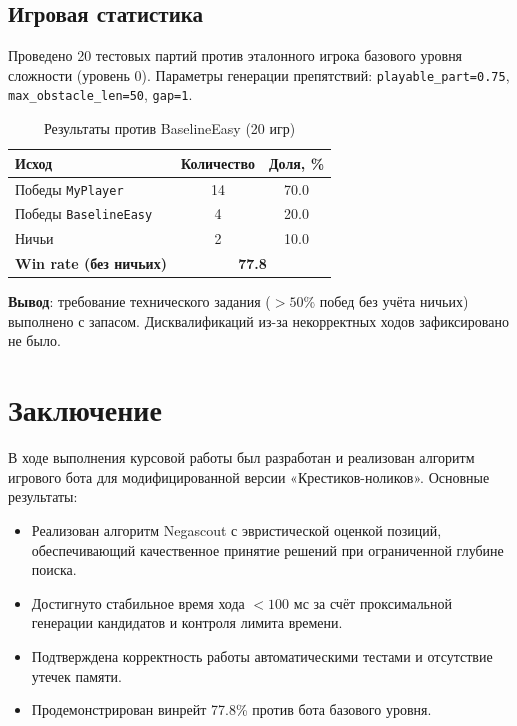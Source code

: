 \documentclass[12pt,a4paper]{article}
\begin{document}
\subsection{Игровая статистика}
Проведено 20 тестовых партий против эталонного игрока базового уровня сложности (уровень 0). Параметры генерации препятствий: \texttt{playable\_part=0.75}, \texttt{max\_obstacle\_len=50}, \texttt{gap=1}.

\begin{table}[h]
\centering
\caption{Результаты против BaselineEasy (20 игр)}
\begin{tabular}{|l|c|c|}
\hline
\textbf{Исход} & \textbf{Количество} & \textbf{Доля, \%} \\ \hline
Победы \texttt{MyPlayer} & 14 & 70.0 \\ \hline
Победы \texttt{BaselineEasy} & 4 & 20.0 \\ \hline
Ничьи & 2 & 10.0 \\ \hline
\textbf{Win rate (без ничьих)} & \multicolumn{2}{c|}{\textbf{77.8}} \\ \hline
\end{tabular}
\end{table}

\noindent
\textbf{Вывод}: требование технического задания ($>50\%$ побед без учёта ничьих) выполнено с запасом. Дисквалификаций из-за некорректных ходов зафиксировано не было.

\section*{Заключение}

В ходе выполнения курсовой работы был разработан и реализован алгоритм игрового бота для модифицированной версии «Крестиков-ноликов». Основные результаты:
\begin{itemize}
    \item Реализован алгоритм Negascout с эвристической оценкой позиций, обеспечивающий качественное принятие решений при ограниченной глубине поиска.
    \item Достигнуто стабильное время хода $< 100$ мс за счёт проксимальной генерации кандидатов и контроля лимита времени.
    \item Подтверждена корректность работы автоматическими тестами и отсутствие утечек памяти.
    \item Продемонстрирован винрейт 77.8\% против бота базового уровня.
\end{itemize}
\end{document}
